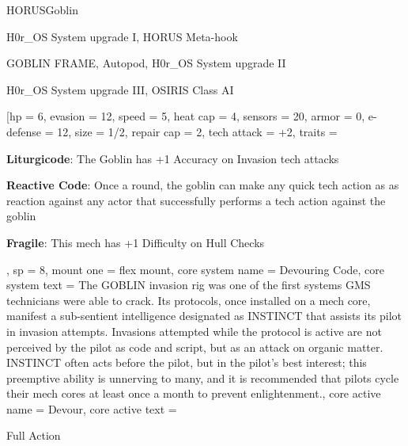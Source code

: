 

\begin{mech}{HORUS}{Goblin}


\begin{license}
\item H0r\_OS System upgrade I, HORUS Meta-hook
\item GOBLIN FRAME, Autopod, H0r\_OS System upgrade II
\item H0r\_OS System upgrade III, OSIRIS Class AI
\end{license}


\frameBox
[hp = 6,
evasion = 12,
speed = 5,
heat cap = 4,
sensors = 20,
armor = 0,
e-defense = 12,
size = 1/2,
repair cap = 2,
tech attack = +2,
traits = {
  \textbf{Liturgicode}: The Goblin has +1 Accuracy on Invasion tech attacks

  \textbf{Reactive Code}: Once a round, the goblin can make any quick tech action as as reaction against any actor that successfully performs a tech action against the goblin

  \textbf{Fragile}: This mech has +1 Difficulty on Hull Checks
  },
sp = 8,
mount one = flex mount,
core system name = Devouring Code,
core system text = {The GOBLIN invasion rig was one of the first systems GMS technicians were able to crack. Its protocols, once installed on a mech core, manifest a sub-sentient intelligence designated as INSTINCT that assists its pilot in invasion attempts. Invasions attempted while the protocol is active are not perceived by the pilot as code and script, but as an attack on organic matter. INSTINCT often acts before the pilot, but in the pilot’s best interest; this preemptive ability is unnerving to many, and it is recommended that pilots cycle their mech cores at least once a month to prevent enlightenment.},
core active name = Devour,
core active text = {Full Action

}
\end{mech}
